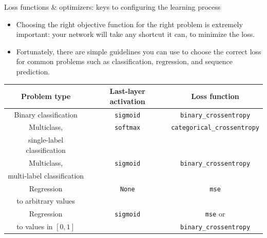 \documentclass{beamer}
\begin{document}
\begin{frame}{Loss functions \& optimizers: keys to configuring the learning process}
\begin{itemize}
\item Choosing the right objective function for the right problem is extremely important: your network will take any shortcut it can, to minimize the loss.
\item Fortunately, there are simple guidelines you can use to choose the correct loss for common problems such as classification, regression, and sequence prediction.
\end{itemize}
{\footnotesize
\begin{tabular}{|c|c|c|}
\hline
Problem type & Last-layer activation & Loss function \\ \hline\hline
Binary classification & \texttt{sigmoid} & \texttt{binary\_crossentropy} \\ \hline
Multiclass,  & \texttt{softmax} & \texttt{categorical\_crossentropy} \\
single-label classification & & \\ \hline
Multiclass,  & \texttt{sigmoid} & \texttt{binary\_crossentropy} \\
multi-label classification & & \\ \hline
Regression & \texttt{None} & \texttt{mse} \\
to arbitrary values & & \\ \hline
Regression & \texttt{sigmoid} & \texttt{mse} or \\
to values in $[0,1]$ & & \texttt{binary\_crossentropy} \\ \hline
\end{tabular}
}
\end{frame}
\end{document}
